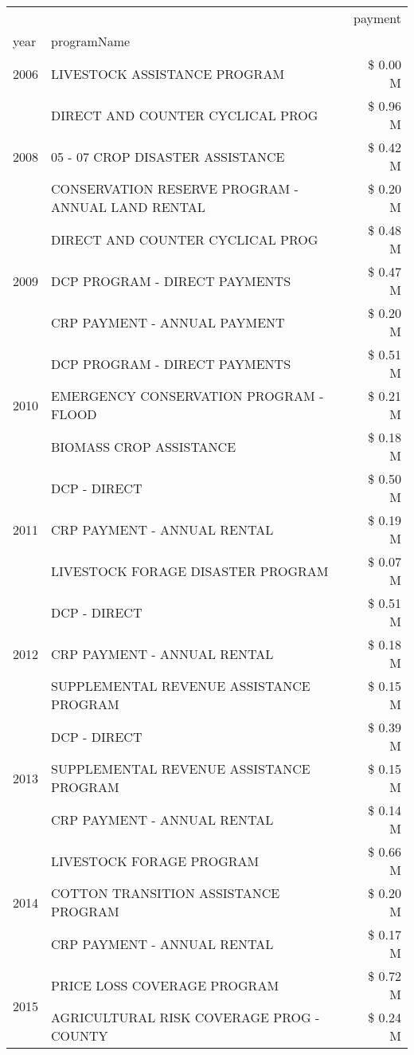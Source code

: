 \begin{tabular}{llr}
\toprule
 &  & payment \\
year & programName &  \\
\midrule
2006 & LIVESTOCK ASSISTANCE PROGRAM & \$ 0.00 M \\
\cline{1-3}
\multirow[t]{3}{*}{2008} & DIRECT AND COUNTER CYCLICAL PROG & \$ 0.96 M \\
 & 05 - 07 CROP DISASTER ASSISTANCE & \$ 0.42 M \\
 & CONSERVATION RESERVE PROGRAM - ANNUAL LAND RENTAL & \$ 0.20 M \\
\cline{1-3}
\multirow[t]{3}{*}{2009} & DIRECT AND COUNTER CYCLICAL PROG & \$ 0.48 M \\
 & DCP PROGRAM - DIRECT PAYMENTS & \$ 0.47 M \\
 & CRP PAYMENT - ANNUAL PAYMENT & \$ 0.20 M \\
\cline{1-3}
\multirow[t]{3}{*}{2010} & DCP PROGRAM - DIRECT PAYMENTS & \$ 0.51 M \\
 & EMERGENCY CONSERVATION PROGRAM - FLOOD & \$ 0.21 M \\
 & BIOMASS CROP ASSISTANCE & \$ 0.18 M \\
\cline{1-3}
\multirow[t]{3}{*}{2011} & DCP - DIRECT & \$ 0.50 M \\
 & CRP PAYMENT - ANNUAL RENTAL & \$ 0.19 M \\
 & LIVESTOCK FORAGE DISASTER PROGRAM & \$ 0.07 M \\
\cline{1-3}
\multirow[t]{3}{*}{2012} & DCP - DIRECT & \$ 0.51 M \\
 & CRP PAYMENT - ANNUAL RENTAL & \$ 0.18 M \\
 & SUPPLEMENTAL REVENUE ASSISTANCE PROGRAM & \$ 0.15 M \\
\cline{1-3}
\multirow[t]{3}{*}{2013} & DCP - DIRECT & \$ 0.39 M \\
 & SUPPLEMENTAL REVENUE ASSISTANCE PROGRAM & \$ 0.15 M \\
 & CRP PAYMENT - ANNUAL RENTAL & \$ 0.14 M \\
\cline{1-3}
\multirow[t]{3}{*}{2014} & LIVESTOCK FORAGE PROGRAM & \$ 0.66 M \\
 & COTTON TRANSITION ASSISTANCE PROGRAM & \$ 0.20 M \\
 & CRP PAYMENT - ANNUAL RENTAL & \$ 0.17 M \\
\cline{1-3}
\multirow[t]{3}{*}{2015} & PRICE LOSS COVERAGE PROGRAM & \$ 0.72 M \\
 & AGRICULTURAL RISK COVERAGE PROG - COUNTY & \$ 0.24 M \\

\end{tabular}
